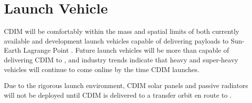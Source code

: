 \documentclass{ws-jai}
\begin{document}
\section{Launch Vehicle}
\label{subsec:launch}
CDIM will be comfortably within the mass and spatial limits of both currently available and development launch vehicles capable of delivering payloads to Sun-Earth Lagrange Point \Ltwo.
Future launch vehicles will be more than capable of delivering CDIM to \Ltwo, and industry trends indicate that heavy and super-heavy vehicles will continue to come online by the time CDIM launches.

Due to the rigorous launch environment, CDIM solar panels and passive radiators will not be deployed until CDIM is delivered to a transfer orbit en route to \Ltwo.
\end{document}
